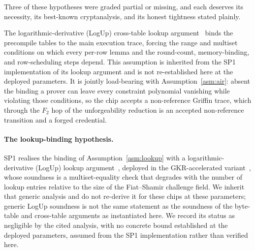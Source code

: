 Three of these hypotheses were graded partial or missing, and each deserves its necessity, its best-known cryptanalysis, and its honest tightness stated plainly.

\begin{assumption}\label{asm:lookup}
    The logarithmic-derivative (LogUp) cross-table lookup argument~\cite{haback2022logup} binds the precompile tables to the main execution trace, forcing the range and multiset conditions on which every per-row lemma and the round-count, memory-binding, and row-scheduling steps depend. This assumption is inherited from the SP1 implementation of its lookup argument and is not re-established here at the deployed parameters. It is jointly load-bearing with Assumption~\ref{asm:air}: absent the binding a prover can leave every constraint polynomial vanishing while violating those conditions, so the chip accepts a non-reference Griffin trace, which through the $F_2$ hop of the unforgeability reduction is an accepted non-reference transition and a forged credential.
\end{assumption}

\paragraph{The lookup-binding hypothesis.}
SP1 realises the binding of Assumption~\ref{asm:lookup} with a logarithmic-derivative (LogUp) lookup argument~\cite{haback2022logup}, deployed in the GKR-accelerated variant~\cite{papini2023logupgkr}, whose soundness is a multiset-equality check that degrades with the number of lookup entries relative to the size of the Fiat--Shamir challenge field. We inherit that generic analysis and do not re-derive it for these chips at these parameters; generic LogUp soundness is not the same statement as the soundness of the byte-table and cross-table arguments as instantiated here. We record its status as negligible by the cited analysis, with no concrete bound established at the deployed parameters, assumed from the SP1 implementation rather than verified here.

